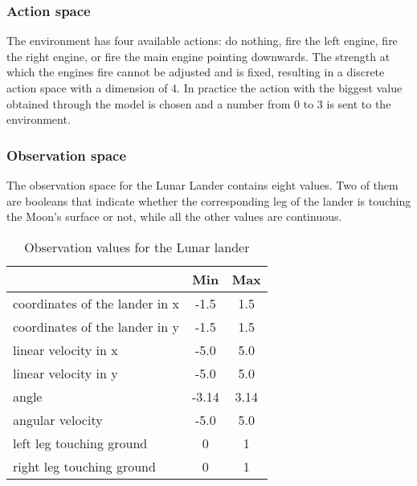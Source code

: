 \subsubsection{Action space}
The environment has four available actions: do nothing, fire the left engine, fire the right engine, or fire the main engine pointing downwards. The strength at which the engines fire cannot be adjusted and is fixed, resulting in a discrete action space with a dimension of 4. In practice the action with the biggest value obtained through the model is chosen and a number from 0 to 3 is sent to the environment.

\subsubsection{Observation space}
The observation space for the Lunar Lander contains eight values.
Two of them are booleans that indicate whether the corresponding leg of the lander is touching the Moon's surface or not, while all the other values are continuous.

\begin{table}[!ht]
\centering
\caption{Observation values for the Lunar lander}
\begin{tabular}[t]{lcc}
\toprule
& Min & Max \\
\midrule
coordinates of the lander in x & -1.5  & 1.5  \\
coordinates of the lander in y & -1.5  & 1.5  \\
linear velocity in x           & -5.0  & 5.0  \\
linear velocity in y           & -5.0  & 5.0  \\
angle                          & -3.14 & 3.14 \\
angular velocity               & -5.0  & 5.0  \\
left leg touching ground       & 0     & 1    \\
right leg touching ground      & 0     & 1    \\
\bottomrule
\end{tabular}
\end{table}%

